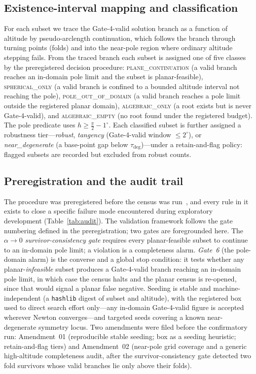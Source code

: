\documentclass[11pt]{article}
\begin{document}
\subsection{Existence-interval mapping and classification}
\label{sec:mapper}

For each subset we trace the Gate-4-valid solution branch as a function of
altitude by pseudo-arclength continuation, which follows the branch through
turning points (folds) and into the near-pole region where ordinary altitude
stepping fails. From the traced branch each subset is assigned one of five
classes by the preregistered decision procedure: \textsc{plane\_continuation}
(a valid branch reaches an in-domain pole limit and the subset is
planar-feasible), \textsc{spherical\_only} (a valid branch is confined to a
bounded altitude interval not reaching the pole), \textsc{pole\_out\_of\_domain} (a valid branch reaches a pole limit outside the registered planar domain), \textsc{algebraic\_only} (a root exists but is never Gate-4-valid), and \textsc{algebraic\_empty} (no root found under the registered budget). The pole predicate uses $h\ge \tfrac{\pi}{2}-1^\circ$. Each classified subset is further assigned a robustness tier---\emph{robust}, \emph{tangency} (Gate-4-valid window $\le 2^\circ$), or \emph{near\_degenerate} (a base-point gap below $\tau_{\deg}$)---under a retain-and-flag policy: flagged subsets are recorded but excluded from robust counts.

\subsection{Preregistration and the audit trail}
\label{sec:gates}

The procedure was preregistered before the census was run~\cite{prereg}, and
every rule in it exists to close a specific failure mode encountered during
exploratory development (Table~\ref{tab:audit}). The validation framework follows the gate numbering defined in the preregistration; two gates are foregrounded here. The \emph{$\alpha\to0$ survivor-consistency gate} requires every planar-feasible subset to continue to an in-domain pole limit; a violation is a completeness alarm. \emph{Gate~6} (the pole-domain alarm) is the converse and a global stop condition: it tests whether any planar-\emph{infeasible} subset produces a Gate-4-valid branch reaching an in-domain pole limit, in which case the census halts and the planar census is re-opened, since that would signal a planar false negative. Seeding is stable and machine-independent (a \texttt{hashlib} digest of subset and altitude), with the registered box used to direct search effort only---any in-domain Gate-4-valid figure is accepted wherever Newton converges---and targeted seeds covering a known near-degenerate symmetry locus. Two amendments were filed before the confirmatory run: Amendment~01 (reproducible stable seeding; box as a seeding heuristic; retain-and-flag tiers) and Amendment~02 (near-pole grid coverage and a generic high-altitude completeness audit, after the survivor-consistency gate detected two fold survivors whose valid branches lie only above their folds).
\end{document}
